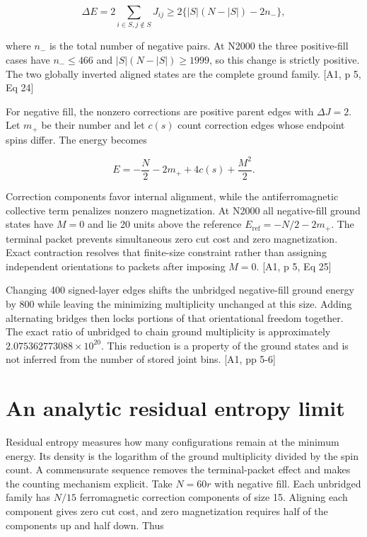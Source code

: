 \[\Delta E=2\sum_{i\in S,j\notin S}J_{ij}\geq 2\{|S|(N-|S|)-2n_-\},\]

where \(n_-\) is the total number of negative pairs. At N2000 the three positive-fill cases have \(n_-\leq466\) and \(|S|(N-|S|)\geq1999\), so this change is strictly positive. The two globally inverted aligned states are the complete ground family. {[}A1, p 5, Eq 24{]}

For negative fill, the nonzero corrections are positive parent edges with \(\Delta J=2\). Let \(m_+\) be their number and let \(c(s)\) count correction edges whose endpoint spins differ. The energy becomes

\[E=-\frac{N}{2}-2m_++4c(s)+\frac{M^2}{2}.\]

Correction components favor internal alignment, while the antiferromagnetic collective term penalizes nonzero magnetization. At N2000 all negative-fill ground states have \(M=0\) and lie 20 units above the reference \(E_{\mathrm{ref}}=-N/2-2m_+\). The terminal packet prevents simultaneous zero cut cost and zero magnetization. Exact contraction resolves that finite-size constraint rather than assigning independent orientations to packets after imposing \(M=0\). {[}A1, p 5, Eq 25{]}

Changing 400 signed-layer edges shifts the unbridged negative-fill ground energy by 800 while leaving the minimizing multiplicity unchanged at this size. Adding alternating bridges then locks portions of that orientational freedom together. The exact ratio of unbridged to chain ground multiplicity is approximately \(2.075362773088\times10^{20}\). This reduction is a property of the ground states and is not inferred from the number of stored joint bins. {[}A1, pp 5-6{]}

\section{An analytic residual entropy limit}\label{an-analytic-residual-entropy-limit}

Residual entropy measures how many configurations remain at the minimum energy. Its density is the logarithm of the ground multiplicity divided by the spin count. A commensurate sequence removes the terminal-packet effect and makes the counting mechanism explicit. Take \(N=60r\) with negative fill. Each unbridged family has \(N/15\) ferromagnetic correction components of size 15. Aligning each component gives zero cut cost, and zero magnetization requires half of the components up and half down. Thus

